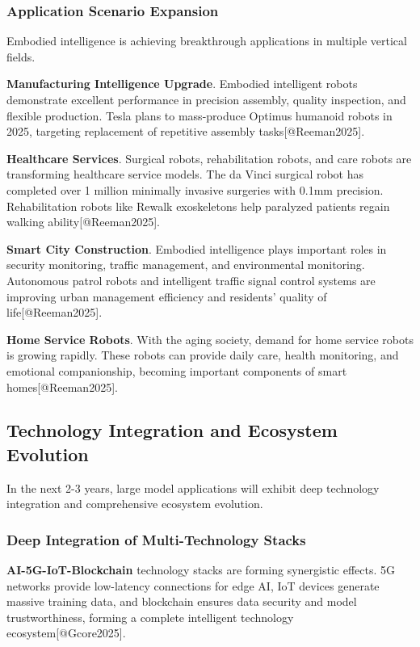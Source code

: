 \documentclass{article}
\begin{document}
\subsubsection{Application Scenario Expansion}
Embodied intelligence is achieving breakthrough applications in multiple vertical fields.

\textbf{Manufacturing Intelligence Upgrade}. Embodied intelligent robots demonstrate excellent performance in precision assembly, quality inspection, and flexible production. Tesla plans to mass-produce Optimus humanoid robots in 2025, targeting replacement of repetitive assembly tasks[@Reeman2025].

\textbf{Healthcare Services}. Surgical robots, rehabilitation robots, and care robots are transforming healthcare service models. The da Vinci surgical robot has completed over 1 million minimally invasive surgeries with 0.1mm precision. Rehabilitation robots like Rewalk exoskeletons help paralyzed patients regain walking ability[@Reeman2025].

\textbf{Smart City Construction}. Embodied intelligence plays important roles in security monitoring, traffic management, and environmental monitoring. Autonomous patrol robots and intelligent traffic signal control systems are improving urban management efficiency and residents' quality of life[@Reeman2025].

\textbf{Home Service Robots}. With the aging society, demand for home service robots is growing rapidly. These robots can provide daily care, health monitoring, and emotional companionship, becoming important components of smart homes[@Reeman2025].

\subsection{Technology Integration and Ecosystem Evolution}
In the next 2-3 years, large model applications will exhibit deep technology integration and comprehensive ecosystem evolution.

\subsubsection{Deep Integration of Multi-Technology Stacks}
\textbf{AI-5G-IoT-Blockchain} technology stacks are forming synergistic effects. 5G networks provide low-latency connections for edge AI, IoT devices generate massive training data, and blockchain ensures data security and model trustworthiness, forming a complete intelligent technology ecosystem[@Gcore2025].
\end{document}
